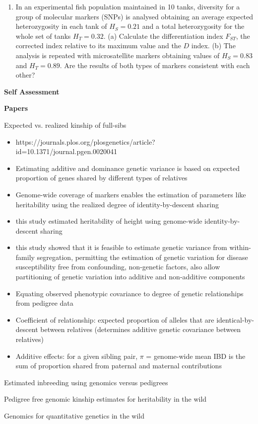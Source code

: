 \documentclass[12pt]{amsart}
\begin{document}
\begin{enumerate}
\item In an experimental fish population maintained in 10 tanks, diversity for a group of molecular markers (SNPs) is analysed obtaining an average expected heterozygosity in each tank of $H_S = 0.21$ and a total heterozygosity for the whole set of tanks $H_T = 0.32$. (a) Calculate the differentiation index $F_{ST}$, the corrected index relative to its maximum value and the $D$ index. (b) The analysis is repeated with microsatellite markers obtaining values of $H_S = 0.83$ and $H_T = 0.89$. Are the results of both types of markers consistent with each other?

\end{enumerate}

{\large \bf Self Assessment}

{\large \bf Papers}

{\large Expected vs. realized kinship of full-sibs}
\begin{itemize}
\item https://journals.plos.org/plosgenetics/article?id=10.1371/journal.pgen.0020041
\item Estimating additive and dominance genetic variance is based on expected proportion of genes shared by different types of relatives
\item Genome-wide coverage of markers enables the estimation of parameters like heritability using the realized degree of identity-by-descent sharing
\item this study estimated heritability of height using genome-wide identity-by-descent sharing 
\item this study showed that it is feasible to estimate genetic variance from within-family segregation, permitting the estimation of genetic variation for disease susceptibility free from confounding, non-genetic factors, also allow partitioning of genetic variation into additive and non-additive components
\item Equating observed phenotypic covariance to degree of genetic relationships from pedigree data
\item Coefficient of relationship: expected proportion of alleles that are identical-by-descent between relatives (determines additive genetic covariance between relatives)
\item Additive effects: for a given sibling pair, $\pi$ = genome-wide mean IBD is the sum of proportion shared from paternal and maternal contributions
\end{itemize}

{\large Estimated inbreeding using genomics versus pedigrees}

{\large Pedigree free genomic kinship estimates for heritability in the wild}

 {\large Genomics for quantitative genetics in the wild}
\end{document}
